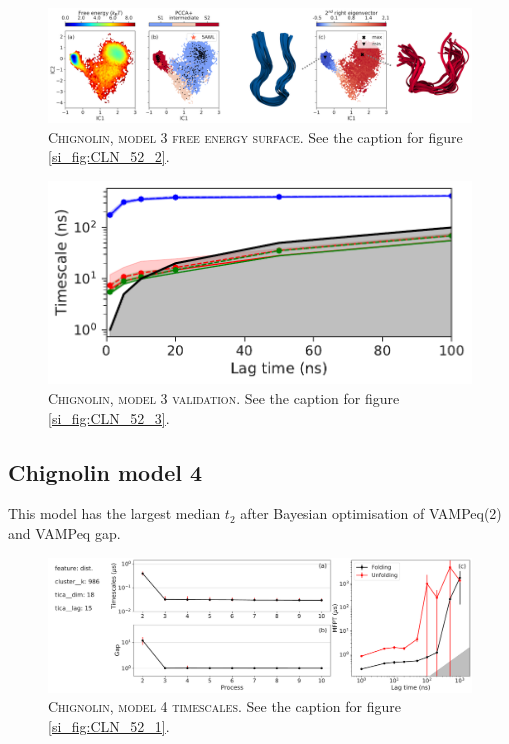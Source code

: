 \documentclass{article}
\begin{document}
\begin{figure}[h]
    \centering
    \includegraphics[width=\columnwidth]{SI_figures/CLN_218_SI-2.png}
    \caption{\textsc{Chignolin,  model 3 free energy surface}. See the caption for figure \ref{si_fig:CLN_52_2}.}
    \label{si_fig:CLN_218_2}
\end{figure}

\begin{figure}[h]
    \centering
    \includegraphics[height=0.15\textheight]{SI_figures/CLN_218_its.pdf}
    \caption{\textsc{Chignolin, model 3 validation}. See the caption for figure \ref{si_fig:CLN_52_3}.}
    \label{si_fig:CLN_218_3}
\end{figure}

\subsection{Chignolin model 4}

This model has the largest median $t_{2}$ after Bayesian optimisation of VAMPeq(2) and VAMPeq gap.

\begin{figure}[h]
    \centering
    \includegraphics[width=\columnwidth]{SI_figures/CLN_93_SI1.pdf}
    \caption{\textsc{Chignolin,  model 4 timescales}.  See the caption for figure \ref{si_fig:CLN_52_1}. }
    \label{si_fig:CLN_93_1}
\end{figure}
\end{document}
